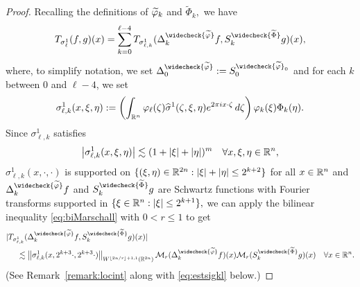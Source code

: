 \begin{proof}
Recalling the definitions of $\widetilde{\varphi}_k$ and $\widetilde{\Phi}_k,$  we have
\begin{align*}
T_{\sigma^1_\ell}(f,g)(x) = 
  \sum\limits_{k=0}^{\ell -4} T_{\sigma^1_{\ell,k}}(\Delta^{\widecheck{\widetilde{\f}}}_k f,S^{\widecheck{\widetilde{\Phi}}}_k g)(x),
\end{align*}
where, to simplify notation, we set $\Delta^{\widecheck{\widetilde{\f}}}_0 :=S^{\widecheck{\widetilde{\f}}_0}_0$ and for each $k$ between $0$ and $\ell -4$, we set 
$$
\sigma^1_{\ell, k}(x, \xi, \eta):=\left( \int_{{{\mathbb R}^n}}  \varphi_\ell(\zeta) \widehat{\sigma}^1(\zeta, \xi, \eta) e^{2\pi i x \cdot \zeta}  \, d\zeta \right)  \varphi_k(\xi) \Phi_k(\eta).
$$ 
Since $\sigma^1_{\ell,k}$ satisfies 
$$\left\vert \sigma^1_{\ell,k}(x,\xi,\eta) \right\vert\lesssim (1+\left\vert \xi \right\vert+\left\vert \eta \right\vert)^m\quad \forall x,\xi,\eta\in{{\mathbb R}^n},$$
$\sigma^1_{\ell, k}(x,\cdot,\cdot)$ is supported on $\{(\xi, \eta) \in \mathbb{R}^{2n} : |\xi| + |\eta| \leq 2^{k+2}\}$ for all $x\in{{\mathbb R}^n}$ and $\Delta^{\widecheck{\widetilde{\f}}}_k f$ and $S^{\widecheck{\widetilde{\Phi}}}_k g$ are Schwartz functions with  Fourier transforms  supported in $\{\xi \in {{\mathbb R}^n}: |\xi| \le 2^{k+1}\},$  we can apply the bilinear inequality \eqref{eq:biMarschall} with $0<r\le 1$ to get 
\begin{align}\label{eq:bound:h1:ell:k}
&|T_{\sigma^1_{\ell,k}}(\Delta^{\widecheck{\widetilde{\f}}}_k f,
S^{\widecheck{\widetilde{\Phi}}}_k g)(x)| \\
&\hspace{0.5cm}\lesssim  \norm{\sigma^1_{\ell, k}(x, 2^{k+3} \cdot, 2^{k+3} \cdot)}{W^{\lfloor{2n/r}\rfloor + 1,1}(\re^{2n})} \mathcal{M}_r(\Delta^{\widecheck{\widetilde{\f}}}_k f)(x)\mathcal{M}_r(
S^{\widecheck{\widetilde{\Phi}}}_k g)(x)\quad \forall x\in\rn.\nonumber
\end{align}
(See Remark~\ref{remark:locint} along with \eqref{eq:estsigkl} below.)


\end{proof}
